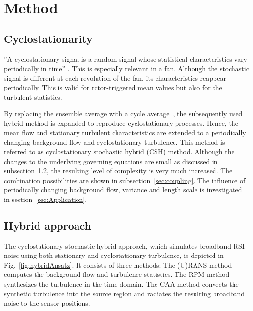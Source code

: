 
\section{Method}
\label{sec:method}

\subsection{Cyclostationarity}
''A cyclostationary signal is a
random signal whose statistical characteristics vary periodically in
time'' \cite{jurdic_investigation_2009}. This is especially relevant in a fan. Although the stochastic signal is different at each revolution of the fan, its characteristics reappear periodically. This is valid for rotor-triggered mean values but also for the turbulent statistics.

By replacing the ensemble average with a cycle average~\cite{gardner_cyclostationarity:_2006}, the subsequently used hybrid method is expanded to reproduce cyclostationary processes. Hence, the mean flow and stationary turbulent characteristics are extended to a periodically changing background flow and cyclostationary turbulence. This method is referred to as cyclostationary stochastic hybrid (CSH) method. Although the changes to the underlying governing equations are small as discussed in subsection~\ref{sec:hybrid}, the resulting level of complexity is very much increased. The combination possibilities are shown in subsection~\ref{sec:coupling}. The influence of periodically changing background flow, variance and length scale is investigated in section~\ref{sec:Application}. 



\subsection{Hybrid approach}
\label{sec:hybrid}
The cyclostationary stochastic hybrid approach, which simulates broadband RSI noise using both stationary and cyclostationary turbulence, is depicted in Fig.~\ref{fig:hybridAnsatz}. It consists of three methods: The (U)RANS method computes the background flow and turbulence statistics. The RPM method synthesizes the turbulence in the time domain. The CAA method convects the synthetic turbulence into the source region and radiates the resulting broadband noise to the sensor positions. 

